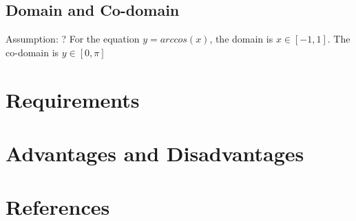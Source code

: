 \documentclass[10pt]{article}
\begin{document}
\subsection{Domain and Co-domain}
Assumption: ? \newline
For the equation $y = arccos(x)$, the domain is $x \in [-1, 1]$. 
The co-domain is $y \in [0, \pi]$



\section{Requirements}

\section{Advantages and Disadvantages}

\section{References}
 
\end{document}
